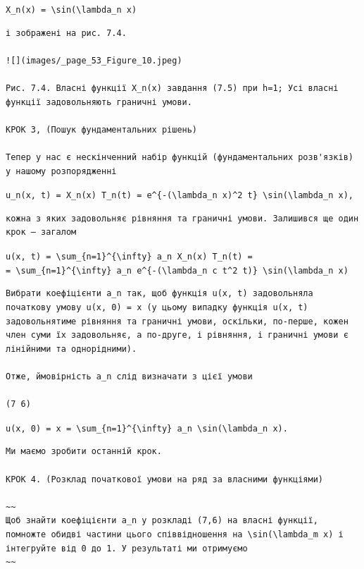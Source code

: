 \documentclass[
  ukrainian,
]{article}
\begin{document}
\texttt{X\_n(x)\ =\ \textbackslash{}sin(\textbackslash{}lambda\_n\ x)}

\begin{verbatim}
і зображені на рис. 7.4.

![](images/_page_53_Figure_10.jpeg)

Рис. 7.4. Власні функції X_n(x) завдання (7.5) при h=1; Усі власні функції задовольняють граничні умови.

КРОК 3, (Пошук фундаментальних рішень)

Тепер у нас є нескінченний набір функцій (фундаментальних розв'язків) у нашому розпорядженні
\end{verbatim}

\texttt{u\_n(x,\ t)\ =\ X\_n(x)\ T\_n(t)\ =\ e\^{}\{-(\textbackslash{}lambda\_n\ x)\^{}2\ t\}\ \textbackslash{}sin(\textbackslash{}lambda\_n\ x),}

\begin{verbatim}
кожна з яких задовольняє рівняння та граничні умови. Залишився ще один крок — загалом
\end{verbatim}

\texttt{u(x,\ t)\ =\ \textbackslash{}sum\_\{n=1\}\^{}\{\textbackslash{}infty\}\ a\_n\ X\_n(x)\ T\_n(t)\ =}
\texttt{=\ \textbackslash{}sum\_\{n=1\}\^{}\{\textbackslash{}infty\}\ a\_n\ e\^{}\{-(\textbackslash{}lambda\_n\ c\ t\^{}2\ t)\}\ \textbackslash{}sin(\textbackslash{}lambda\_n\ x)}

\begin{verbatim}
Вибрати коефіцієнти a_n так, щоб функція u(x, t) задовольняла початкову умову u(x, 0) = x (у цьому випадку функція u(x, t) задовольнятиме рівняння та граничні умови, оскільки, по-перше, кожен член суми їх задовольняє, а по-друге, і рівняння, і граничні умови є лінійними та однорідними).

Отже, ймовірність a_n слід визначати з цієї умови

(7 6)
\end{verbatim}

\texttt{u(x,\ 0)\ =\ x\ =\ \textbackslash{}sum\_\{n=1\}\^{}\{\textbackslash{}infty\}\ a\_n\ \textbackslash{}sin(\textbackslash{}lambda\_n\ x).}

\begin{verbatim}
Ми маємо зробити останній крок.

КРОК 4. (Розклад початкової умови на ряд за власними функціями)

~~
Щоб знайти коефіцієнти a_n у розкладі (7,6) на власні функції, помножте обидві частини цього співвідношення на \sin(\lambda_m x) і інтегруйте від 0 до 1. У результаті ми отримуємо
~~
\end{verbatim}
\end{document}
